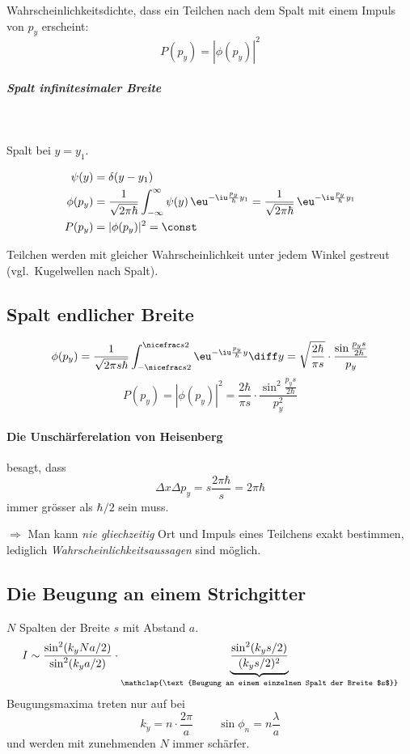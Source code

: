 			Wahrscheinlichkeitsdichte, dass ein Teilchen nach dem Spalt mit einem Impuls von $p_y$ erscheint:
			\[
				P(p_y) = |\phi(p_y)|^2
			\]
			
			\subparagraph{Spalt infinitesimaler Breite} %
				~
				
				Spalt bei $y=y_1$.

				\begin{align*}
					\psi(y) &= \delta(y - y_1) \\
					\phi(p_y) &= \frac{1}{\sqrt{2\pi\hbar}} \int_{-\infty}^{\infty}
						\psi(y) \,\eu^{- \iu \frac{p_y}{\hbar} y_1}
						= \frac{1}{\sqrt{2\pi\hbar}} \,\eu^{- \iu \frac{p_y}{\hbar} y_1} \\
					P(p_y) &= |\phi(p_y)|^2 = \const
				\end{align*}

				Teilchen werden mit gleicher Wahrscheinlichkeit unter jedem Winkel gestreut (vgl.~Kugelwellen nach Spalt).
			\subsection{Spalt endlicher Breite} %
				\[
					\phi(p_y) = \frac{1}{\sqrt{2\pi s \hbar}} \int_{-\nicefrac s 2}^{\nicefrac s 2} \eu^{-\iu \frac{p_y}{\hbar}y} \diff y = \sqrt{\frac{2\hbar}{\pi s}} \cdot \frac{\sin\frac{p_y s}{2\hbar}}{p_y}
				\]
				\[
					P(p_y) = |\phi(p_y)|^2 = \frac{2\hbar}{\pi s} \cdot \frac{\sin^2\frac{p_y s}{2\hbar}}{p_y^2}
				\]
		\paragraph{Die Unschärferelation von Heisenberg} %
			besagt, dass
			\[
				\Delta x \Delta p_y = s \frac{2 \pi \hbar}{s} = 2\pi\hbar
			\]
			immer grösser als $\hbar/2$ sein muss.
			
			$\Rightarrow$ Man kann \emph{nie gliechzeitig} Ort und Impuls eines Teilchens exakt bestimmen, lediglich \emph{Wahrscheinlichkeitsaussagen} sind möglich.
	\subsection{Die Beugung an einem Strichgitter} %
		$N$ Spalten der Breite $s$ mit Abstand $a$.
		\[
			I \sim \frac{\sin^2(k_y N a/2)}{\sin^2(k_y a / 2)} \cdot \underbrace{\frac{\sin^2(k_y s /2)}{(k_y s / 2)^2}}_{\mathclap{\text{Beugung an einem einzelnen Spalt der Breite $s$}}}
		\]
		Beugungsmaxima treten nur auf bei
		\[
			k_y = n \cdot \frac{2\pi}{a} \,\qquad
			\sin \phi_n = n \frac{\lambda}{a}
		\]
		und werden mit zunehmenden $N$ immer schärfer.

